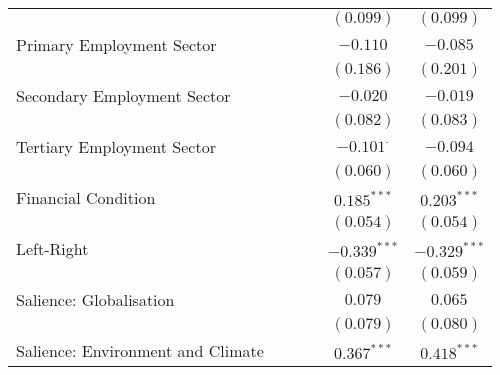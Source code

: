 \begin{center}
\begin{tiny}
\begin{longtable}{l@{} c@{} c@{} c@{} c@{} c@{}}
                                                      &                 &                  &                 & $(0.099)$        & $(0.099)$        \\
\quad Primary Employment Sector                       &                 &                  &                 & $-0.110$         & $-0.085$         \\
                                                      &                 &                  &                 & $(0.186)$        & $(0.201)$        \\
\quad Secondary Employment Sector                     &                 &                  &                 & $-0.020$         & $-0.019$         \\
                                                      &                 &                  &                 & $(0.082)$        & $(0.083)$        \\
\quad Tertiary Employment Sector                      &                 &                  &                 & $-0.101^{\cdot}$ & $-0.094$         \\
                                                      &                 &                  &                 & $(0.060)$        & $(0.060)$        \\
\quad Financial Condition                             &                 &                  &                 & $0.185^{***}$    & $0.203^{***}$    \\
                                                      &                 &                  &                 & $(0.054)$        & $(0.054)$        \\
\quad Left-Right                                      &                 &                  &                 & $-0.339^{***}$   & $-0.329^{***}$   \\
                                                      &                 &                  &                 & $(0.057)$        & $(0.059)$        \\
\quad Salience: Globalisation                         &                 &                  &                 & $0.079$          & $0.065$          \\
                                                      &                 &                  &                 & $(0.079)$        & $(0.080)$        \\
\quad Salience: Environment and Climate               &                 &                  &                 & $0.367^{***}$    & $0.418^{***}$    \\

\end{longtable}
\end{tiny}
\end{center}

